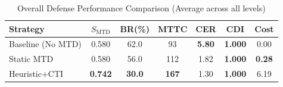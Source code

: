\begin{table}[!t]
\centering
\caption{Overall Defense Performance Comparison (Average across all levels)}
\label{tab:overall_performance}
\renewcommand{\arraystretch}{1.1}
\begin{tabular}{@{}lcccccc@{}}
\toprule
\textbf{Strategy} & $S_{\mathrm{MTD}}$ & \textbf{BR(\%)} & \textbf{MTTC} & \textbf{CER} & \textbf{CDI} & \textbf{Cost} \\
\midrule
Baseline (No MTD) & 0.580 & 62.0 & 93 & \textbf{5.80} & \textbf{1.000} & 0.00 \\
Static MTD & 0.580 & 56.0 & 112 & 1.82 & \textbf{1.000} & \textbf{0.28} \\
Heuristic+CTI & \textbf{0.742} & \textbf{30.0} & \textbf{167} & 1.30 & \textbf{1.000} & 6.19 \\
\bottomrule
\end{tabular}
\end{table}
